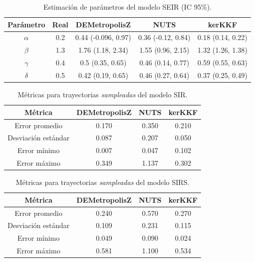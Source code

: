 \begin{table}[h!]
    \centering
    \caption{Estimación de parámetros del modelo SEIR (IC 95\%).} 
    \begin{tabular}{|c|c|c|c|c|}
    \hline
    \textbf{Parámetro}& \textbf{Real} & \textbf{DEMetropolisZ} & \textbf{NUTS} & \textbf{kerKKF}  \\ \hline
    $\alpha$ & 0.2 & 0.44 (-0.096, 0.97) & 0.36 (-0.12, 0.84) & 0.18 (0.14, 0.22) \\ \hline
    $\beta$ & 1.3 & 1.76 (1.18, 2.34) & 1.55 (0.96, 2.15) & 1.32 (1.26, 1.38)\\  \hline
    $\gamma$ & 0.4 & 0.5 (0.35, 0.65) & 0.46 (0.14, 0.77)
 & 0.59 (0.55, 0.63)\\ \hline
    $\delta$ & 0.5 & 0.42 (0.19, 0.65) & 0.46 (0.27, 0.64) & 0.37 (0.25, 0.49)\\ \hline
    \end{tabular}
    \label{tab:SEIR_params}
\end{table}

\begin{table}[h!]
    \centering
    \begin{tabular}{|c|c|c|c|}
    \hline
    \textbf{Métrica} & \textbf{DEMetropolisZ} & \textbf{NUTS} & \textbf{kerKKF} \\
    \hline
    Error promedio & 0.170 & 0.350 & 0.210 \\
    \hline
    Desviación estándar & 0.087 & 0.207 & 0.050 \\
    \hline
    Error mínimo & 0.007 & 0.047 & 0.102 \\
    \hline
    Error máximo & 0.349 & 1.137 & 0.302 \\
    \hline
    \end{tabular}
    \caption{Métricas para trayectorias \textit{sampleadas} del modelo SIR.}
    \label{tab:metricas_traj_SIR}
\end{table}

\begin{table}[h!]
    \centering
    \begin{tabular}{|c|c|c|c|}
\hline
\textbf{Métrica} & \textbf{DEMetropolisZ} & \textbf{NUTS} & \textbf{kerKKF} \\
\hline
Error promedio & 0.240 & 0.570 & 0.270 \\
\hline
Desviación estándar & 0.109 & 0.231 & 0.115 \\
\hline
Error mínimo & 0.049 & 0.090 & 0.024 \\
\hline
Error máximo & 0.581 & 1.100 & 0.534 \\
\hline
\end{tabular}
    \caption{Métricas para trayectorias \textit{sampleadas} del modelo SIRS.}
    \label{tab:metricas_traj_SIRS}
\end{table}


